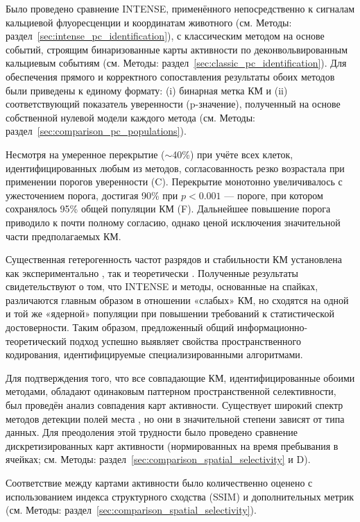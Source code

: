 Было проведено сравнение INTENSE, применённого непосредственно к сигналам кальциевой флуоресценции и
координатам животного (см. Методы: раздел~\ref{sec:intense_pc_identification}), с
классическим методом на основе событий, строящим бинаризованные карты активности по деконвольвированным
кальциевым событиям \cite{skaggs1993information} (см. Методы:
раздел~\ref{sec:classic_pc_identification}). Для обеспечения прямого и корректного сопоставления результаты обоих методов были приведены к единому формату: (i) бинарная метка КМ и (ii) соответствующий показатель уверенности (p-значение), полученный на основе собственной нулевой модели каждого метода (см.
Методы: раздел~\ref{sec:comparison_pc_populations}).

Несмотря на умеренное перекрытие ($\sim$40\%) при учёте всех клеток, идентифицированных любым из
методов, согласованность резко возрастала при применении порогов уверенности
(C). Перекрытие монотонно увеличивалось с ужесточением порога, достигая
90\% при $p < 0.001$ --- пороге, при котором сохранялось 95\% общей популяции КМ
(F). Дальнейшее повышение порога приводило к почти полному
согласию, однако ценой исключения значительной части предполагаемых КМ.

Существенная гетерогенность частот разрядов и стабильности КМ установлена как
экспериментально \cite{Mizuseki2012}, так и теоретически \cite{Lian2022}.
Полученные результаты свидетельствуют о том, что INTENSE и методы, основанные на спайках, различаются главным образом в отношении
«слабых» КМ, но сходятся на одной и той же «ядерной» популяции при повышении
требований к статистической достоверности. Таким образом, предложенный общий
информационно-теоретический подход успешно выявляет свойства пространственного кодирования,
идентифицируемые специализированными алгоритмами.


Для подтверждения того, что все совпадающие КМ, идентифицированные обоими методами, обладают одинаковым паттерном
пространственной селективности, был проведён анализ совпадения карт активности. Существует
широкий спектр методов детекции полей места \cite{Grieves2017}, но они в
значительной степени зависят от типа данных. Для преодоления этой трудности было проведено сравнение
дискретизированных карт активности (нормированных на время пребывания в ячейках; см. Методы:
раздел~\ref{sec:comparison_spatial_selectivity} и D).

Соответствие между картами активности было количественно оценено с использованием индекса структурного
сходства (SSIM) и дополнительных метрик (см. Методы:
раздел~\ref{sec:comparison_spatial_selectivity}).

